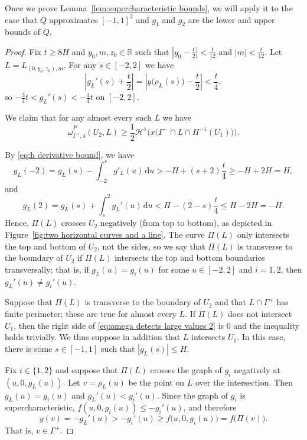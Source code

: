 \documentclass[11pt,reqno]{amsart}
\newcommand{\wwidehat}[1]{\widehat{#1}}
\newcommand{\R}{\mathbb{R}}
\newcommand{\cH}{\mathcal{H}}
\newcommand{\ud}[0]{\,\mathrm{d}}
\newcommand{\0}{\mathbf{0}}
\renewcommand{\1}{\mathbf 1}
\renewcommand{\ge}{\geqslant}
\renewcommand{\le}{\leqslant}
\theoremstyle{remark}
\begin{document}
Once we prove Lemma~\ref{lem:supercharacteristic bounds}, we will apply it to the case that $Q$ approximates $[-1,1]^2$ and $g_1$ and $g_2$ are the lower and upper bounds of $Q$.

\begin{proof}
  Fix  $t\ge 8H$ and $y_0,m,z_0\in \R$ such that $|y_0-\frac{t}{2}|< \frac{t}{12}$  and $|m|< \frac{t}{12}$.  Let $L=L_{(0,y_0,z_0) ,m}$.  For any $s\in [-2,2]$ we have
  \begin{equation}\label{eq:h derivative bound}
    \left|g_L'(s)+\frac{t}{2}\right| = \left|y\big(\rho_L(s)\big)-\frac{t}{2}\right| < \frac{t}{4},
  \end{equation}
  so $-\frac34 t < g_L'(s) < -\frac{1}{4}t$ on $[-2,2]$.

  We claim that for any almost every such $L$ we have
  \begin{equation}\label{eq:omega detects large values 2}
    \wwidehat{\omega}^P_{\Gamma^+, 4}(U_2, L) \ge \frac{1}{2} \cH^1\Big(x\big(\Gamma^-\cap L\cap \Pi^{-1}(U_1)\big)\Big).
  \end{equation}

  By \eqref{eq:h derivative bound}, we have
  $$
  g_L(-2)=g_L(s)-\int_{-2}^s g'_L(u)\ud u> -H+(s+2)\frac{t}{4}\ge -H+2H=H,
  $$
  and
  $$
  g_L(2)=g_L(s)+\int_s^2g_L'(u)\ud u<H-(2-s)\frac{t}{4}\le H-2H=-H.
  $$
  Hence, $\Pi(L)$ crosses $U_2$ negatively (from top to bottom), as depicted in Figure~\ref{fig:two horizontal curves and a line}.
  The curve $\Pi(L)$ only intersects the top and bottom of $U_2$, not the sides, so we say that $\Pi(L)$ is transverse to the boundary of $U_2$ if $\Pi(L)$ intersects the top and bottom boundaries transversally; that is, if $g_L(u)=g_i(u)$ for some $u\in [-2,2]$ and $i=1,2$, then $g_L'(u) \ne g_i'(u)$.

  Suppose that $\Pi(L)$ is transverse to the boundary of $U_2$ and that $L\cap \Gamma^+$ has finite perimeter; these are true for almost every $L$.  If $\Pi(L)$ does not intersect $U_1$, then the right side of \eqref{eq:omega detects large values 2} is 0 and the inequality holds trivially.  We thus suppose in addition that $L$ intersects $U_1$. In this case, there is some $s\in [-1,1]$ such that $|g_{L}(s)|\le H$.

 Fix $i\in \{1,2\}$ and suppose that $\Pi(L)$ crosses the graph of $g_i$ negatively at $(u,0,g_L(u))$. Let $v=\rho_L(u)$ be the point on $L$  over the intersection.  Then $g_L(u) = g_i(u)$ and $g_L'(u) < g_i'(u)$.  Since the graph of $g_i$ is supercharacteristic, $f(u,0,g_i(u)) \le -g_i'(u)$, and therefore
  $$y(v) = -g_L'(u) > -g_i'(u) \ge f\big(u,0,g_i(u)\big) = f\big(\Pi(v)\big).$$
  That is, $v\in \Gamma^+$.


\end{proof}
\end{document}
